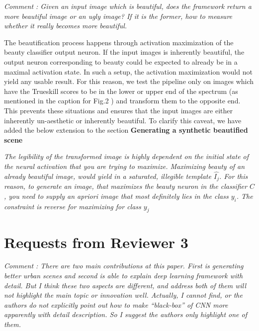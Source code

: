 \documentclass{paper}
\newenvironment{myquote}
{\definecolor{shadecolor}{rgb}{0.9,0.95,1} \begin{shaded*} \sf \em}
{\em\end{shaded*}}
\newenvironment{myquoteOrange}
{\definecolor{shadecolor}{rgb}{1,0.9,0.83} \begin{shaded*} \sf \em}
{\em\end{shaded*}}
\begin{document}
\begin{myquote}
\noindent Comment : Given an input image which is beautiful, does the framework return a more beautiful image or an ugly image? If it is the former, how to measure whether it really becomes more beautiful. 
\end{myquote}

\noindent %
The beautification process happens through activation maximization of the beauty classifier output neuron. If the input images is inherently beautiful, the output neuron corresponding to beauty could be expected to already be in a maximal activation state. In such a setup, the activation maximization would not yield any usable result. For this reason, we test the pipeline only on images which have the Trueskill scores to be in the lower or upper end of the spectrum (as mentioned in the caption for Fig.2 ) and transform them to the opposite end. This prevents these situations and ensures that the input images are either inherently un-aesthetic or inherently beautiful. To clarify this caveat, we have added the below extension to the section \textbf{Generating a synthetic beautified scene}

\begin{myquoteOrange}
The legibility of the transformed image is highly dependent on the initial state of the neural activation that you are trying to maximize. Maximizing beauty of an already beautiful image, would yield in a saturated, illegible template $\hat{I_j}$. For this reason, to generate an image, that maximizes the beauty neuron in the classifier $C$ , you need to supply an apriori image that most definitely lies in the class $y_i$. The constraint is reverse for maximizing for class $y_j$
\end{myquoteOrange}


\section*{Requests from Reviewer 3}


\begin{myquote}
\noindent Comment : There are two main contributions at this paper. First is generating better urban scenes and second is able to explain deep learning framework with detail. But I think these two aspects are different, and address both of them will not highlight the main topic or innovation well. Actually, I cannot find, or the authors do not explicitly point out how to make “black-box” of CNN more apparently with detail description. So I suggest the authors only highlight one of them.
\end{myquote}
\end{document}
